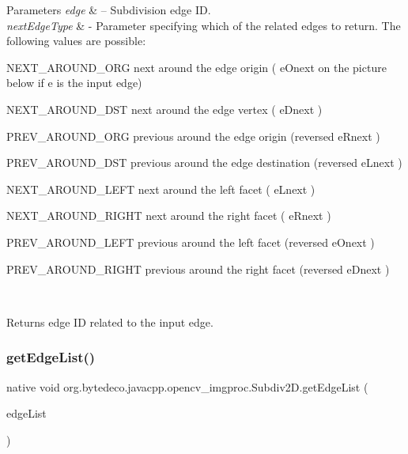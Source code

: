\begin{DoxyParams}{Parameters}
{\em edge} & – Subdivision edge ID. \\
\hline
{\em next\+Edge\+Type} & -\/ Parameter specifying which of the related edges to return. The following values are possible\+:
\begin{DoxyItemize}
\item N\+E\+X\+T\+\_\+\+A\+R\+O\+U\+N\+D\+\_\+\+O\+RG next around the edge origin ( e\+Onext on the picture below if e is the input edge)
\item N\+E\+X\+T\+\_\+\+A\+R\+O\+U\+N\+D\+\_\+\+D\+ST next around the edge vertex ( e\+Dnext )
\item P\+R\+E\+V\+\_\+\+A\+R\+O\+U\+N\+D\+\_\+\+O\+RG previous around the edge origin (reversed e\+Rnext )
\item P\+R\+E\+V\+\_\+\+A\+R\+O\+U\+N\+D\+\_\+\+D\+ST previous around the edge destination (reversed e\+Lnext )
\item N\+E\+X\+T\+\_\+\+A\+R\+O\+U\+N\+D\+\_\+\+L\+E\+FT next around the left facet ( e\+Lnext )
\item N\+E\+X\+T\+\_\+\+A\+R\+O\+U\+N\+D\+\_\+\+R\+I\+G\+HT next around the right facet ( e\+Rnext )
\item P\+R\+E\+V\+\_\+\+A\+R\+O\+U\+N\+D\+\_\+\+L\+E\+FT previous around the left facet (reversed e\+Onext )
\item P\+R\+E\+V\+\_\+\+A\+R\+O\+U\+N\+D\+\_\+\+R\+I\+G\+HT previous around the right facet (reversed e\+Dnext ) 
\end{DoxyItemize}\\
\hline
\end{DoxyParams}
 

\begin{DoxyReturn}{Returns}
edge ID related to the input edge. 
\end{DoxyReturn}
\mbox{\label{group__imgproc_ga8171761378651c75f5e8ed774c54fa55}} 
\subsubsection{\texorpdfstring{get\+Edge\+List()}{getEdgeList()}}
{\footnotesize\ttfamily native void org.\+bytedeco.\+javacpp.\+opencv\+\_\+imgproc.\+Subdiv2\+D.\+get\+Edge\+List (\begin{DoxyParamCaption}\item[{@Cast(\char`\"{}cv\+::\+Vec4f$\ast$\char`\"{}) @Std\+Vector Float\+Pointer}]{edge\+List }\end{DoxyParamCaption})}



